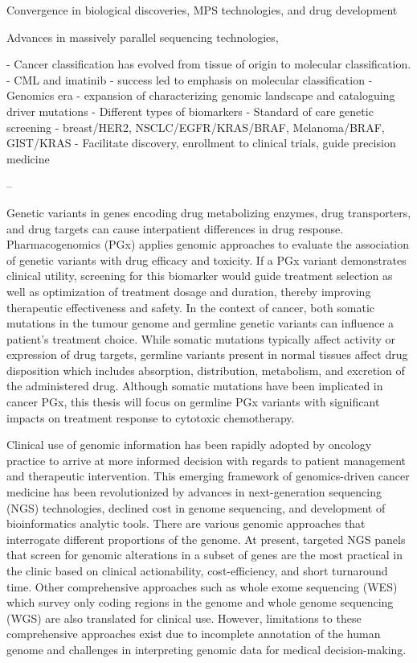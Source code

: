 Convergence in biological discoveries, MPS technologies, and drug development

Advances in massively parallel sequencing technologies,

- Cancer classification has evolved from tissue of origin to molecular classification.
- CML and imatinib - success led to emphasis on molecular classification
- Genomics era - expansion of characterizing genomic landscape and cataloguing driver mutations
- Different types of biomarkers
- Standard of care genetic screening - breast/HER2, NSCLC/EGFR/KRAS/BRAF, Melanoma/BRAF, GIST/KRAS
- Facilitate discovery, enrollment to clinical trials, guide precision medicine

--

Genetic variants in genes encoding drug metabolizing enzymes, drug transporters, and drug targets can cause interpatient differences in drug response. Pharmacogenomics (PGx) applies genomic approaches to evaluate the association of genetic variants with drug efficacy and toxicity. If a PGx variant demonstrates clinical utility, screening for this biomarker would guide treatment selection as well as optimization of treatment dosage and duration, thereby improving therapeutic effectiveness and safety. In the context of cancer, both somatic mutations in the tumour genome and germline genetic variants can influence a patient's treatment choice. While somatic mutations typically affect activity or expression of drug targets, germline variants present in normal tissues affect drug disposition which includes absorption, distribution, metabolism, and excretion of the administered drug. Although somatic mutations have been implicated in cancer PGx, this thesis will focus on germline PGx variants with significant impacts on treatment response to cytotoxic chemotherapy.

Clinical use of genomic information has been rapidly adopted by oncology practice to arrive at more informed decision with regards to patient management and therapeutic intervention. This emerging framework of genomics-driven cancer medicine has been revolutionized by advances in next-generation sequencing (NGS) technologies, declined cost in genome sequencing, and development of bioinformatics analytic tools. There are various genomic approaches that interrogate different proportions of the genome. At present, targeted NGS panels that screen for genomic alterations in a subset of genes are the most practical in the clinic based on clinical actionability, cost-efficiency, and short turnaround time. Other comprehensive approaches such as whole exome sequencing (WES) which survey only coding regions in the genome and whole genome sequencing (WGS) are also translated for clinical use. However, limitations to these comprehensive approaches exist due to incomplete annotation of the human genome and challenges in interpreting genomic data for medical decision-making.

